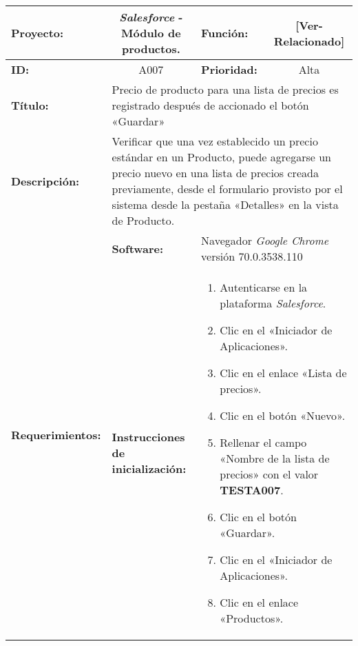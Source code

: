 \begin{table}
\renewcommand{\arraystretch}{1}
\linespread{1}
\centering
\begin{tabular}{|p{2.5cm}|p{2.8cm}|p{2.2cm}|p{2.8cm}|p{2.2cm}|}
\hline
\footnotesize{\textbf{Proyecto:}} &
\multicolumn{2}{c|}{\footnotesize{\emph{Salesforce} - Módulo de productos.}} &
\footnotesize{\textbf{Función:}} &
\multicolumn{1}{c|}{\footnotesize{[Ver-Relacionado]}} \\
\hline
\footnotesize{\textbf{ID:}} & \multicolumn{2}{c|}{\footnotesize{A007}} &
\footnotesize{\textbf{Prioridad:}} &
\multicolumn{1}{c|}{\footnotesize{Alta}} \\
\hline
\footnotesize{\textbf{Título:}} &
\multicolumn{4}{p{12.4cm}|}{\footnotesize{Precio de producto para una lista de
precios es registrado después de accionado el botón «Guardar»}} \\
\hline
\footnotesize{\textbf{Descripción:}} &
\multicolumn{4}{p{12.4cm}|}{\footnotesize{Verificar que una vez establecido un
precio estándar en un Producto, puede agregarse un precio nuevo en una lista de
precios creada previamente, desde el formulario provisto por el sistema desde
la pestaña «Detalles» en la vista de Producto.}} \\
\hline
\multirow{2}{*}{\footnotesize{\textbf{Requerimientos:}}} &
\footnotesize{\textbf{Software:}} &
\multicolumn{3}{p{7.8cm}|}{\footnotesize{Navegador \emph{Google Chrome}
versión 70.0.3538.110}} \\
\cline{2-5}
& \footnotesize{\textbf{Instrucciones de inicialización:}} &
\multicolumn{3}{p{7.8cm}|}{\footnotesize{
\vspace{-3mm}
\begin{enumerate}
\item Autenticarse en la plataforma \emph{Salesforce}.
\item Clic en el «Iniciador de Aplicaciones».
\item Clic en el enlace «Lista de precios».
\item Clic en el botón «Nuevo».
\item Rellenar el campo «Nombre de la lista de precios» con el valor
    \textbf{TESTA007}.
\item Clic en el botón «Guardar».
\item Clic en el «Iniciador de Aplicaciones».
\item Clic en el enlace «Productos».
\end{enumerate}
\vspace{-5mm}
}} \\

\end{tabular}
\end{table}
